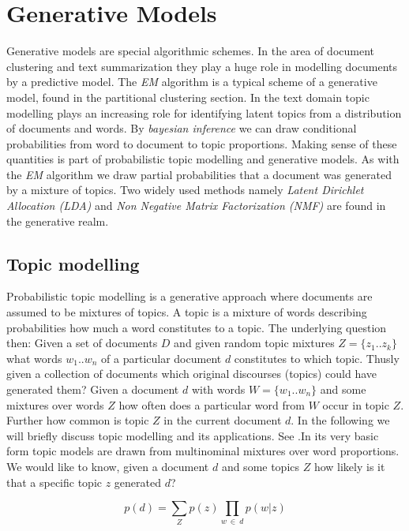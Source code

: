 \section{Generative Models}    

  Generative models are special algorithmic schemes. In the area of document clustering and text summarization they play a huge role in modelling documents by a predictive model.
  The \emph{EM} algorithm is a typical scheme of a generative model, found in the partitional clustering section. In the text domain topic modelling plays an increasing role for identifying latent topics from a distribution of documents and words. By \emph{bayesian inference} we can draw conditional probabilities from word to document to topic proportions. Making sense of these quantities is part of probabilistic topic modelling and generative models. As with the \emph{EM} algorithm we draw partial probabilities that a document was generated by a mixture of topics. Two widely used methods namely \emph{Latent Dirichlet Allocation (LDA)} and \emph{Non Negative Matrix Factorization (NMF)} are found in the generative realm.

  \subsection{Topic modelling}
    Probabilistic topic modelling is a generative approach where documents are assumed to be mixtures of topics. A topic is a mixture of words describing probabilities how much a word constitutes to a topic. The underlying question then: Given a set of documents $D$ and given random topic mixtures $Z=\{z_1..z_k\}$ what words $w_1..w_n$ of a particular document $d$ constitutes to which topic. Thusly given a collection of documents which original discourses (topics) could have generated them? Given a document $d$ with words $W=\{w_1..w_n\}$ and some mixtures over words $Z$ how often does a particular word from $W$ occur in topic $Z$. Further how common is topic $Z$ in the current document $d$. In the following we will briefly discuss topic modelling and its applications. See \cite{TopicModelsBlei2012}.In its very basic form topic models are drawn from multinominal mixtures over word proportions. We would like to know, given a document $d$ and some topics $Z$ how likely is it that a specific topic $z$ generated $d$?

      \begin{equation}
        p(d) = \sum_{Z} p(z) \prod_{w\:\in\:d}p(w|z)
      \end{equation}


